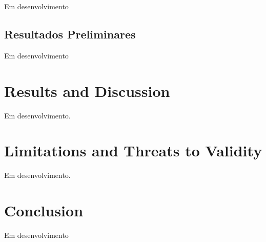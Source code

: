 \documentclass[kdmile,a4paper]{kdmile}
\begin{document}
Em desenvolvimento

\subsection{Resultados Preliminares}

Em desenvolvimento


\section{Results and Discussion}
\label{sec:results}

Em desenvolvimento.

\section{Limitations and Threats to Validity}
\label{sec:limitations}

Em desenvolvimento.

\section{Conclusion}
\label{sec:conclusion}

Em desenvolvimento


\begin{received}
\end{received}




%
%
\end{document}
